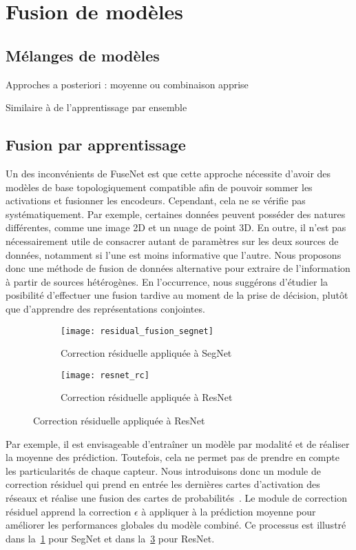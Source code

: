 \section{Fusion de modèles}

\subsection{Mélanges de modèles}

Approches a posteriori : moyenne ou combinaison apprise

Similaire à de l'apprentissage par ensemble

\subsection{Fusion par apprentissage}

Un des inconvénients de FuseNet est que cette approche nécessite d'avoir des modèles de base topologiquement compatible afin de pouvoir sommer les activations et fusionner les encodeurs. Cependant, cela ne se vérifie pas systématiquement. Par exemple, certaines données peuvent posséder des natures différentes, comme une image 2D et un nuage de point 3D. En outre, il n'est pas nécessairement utile de consacrer autant de paramètres sur les deux sources de données, notamment si l'une est moins informative que l'autre. Nous proposons donc une méthode de fusion de données alternative pour extraire de l'information à partir de sources hétérogènes. En l'occurrence, nous suggérons d'étudier la posibilité d'effectuer une fusion tardive au moment de la prise de décision, plutôt que d'apprendre des représentations conjointes.

\begin{figure}
   \begin{subfigure}{0.5\textwidth}
     \texttt{[image: residual\_fusion\_segnet]}
     \caption{Correction résiduelle appliquée à SegNet}
     \label{fig:residual_correction}
   \end{subfigure}
   \begin{subfigure}{0.5\textwidth}
     \texttt{[image: resnet\_rc]}
     \caption{Correction résiduelle appliquée à ResNet}
     \label{fig:residual_correction_resnet}
   \end{subfigure}
\end{figure}

Par exemple, il est envisageable d'entraîner un modèle par modalité et de réaliser la moyenne des prédiction. Toutefois, cela ne permet pas de prendre en compte les particularités de chaque capteur. Nous introduisons donc un module de correction résiduel qui prend en entrée les dernières cartes d'activation des réseaux et réalise une fusion des cartes de probabilités~\cite{audebert_semantic_2016}. Le module de correction résiduel apprend la correction $\epsilon$ à appliquer à la prédiction moyenne pour améliorer les performances globales du modèle combiné. Ce processus est illustré dans la~\cref{fig:residual_correction} pour SegNet et dans la~\cref{fig:residual_correction_resnet} pour ResNet.

